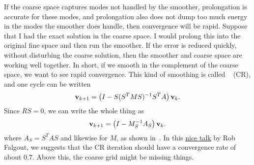 \begin{refsection}
If the coarse space captures modes not handled by the smoother, prolongation is accurate for these modes, and prolongation also does not dump too much energy in the modes the smoother does handle, then convergence will be rapid. Suppose that I had the exact solution in the coarse space. I would prolong this into the original fine space and then run the smoother. If the error is reduced quickly, without disturbing the coarse solution, then the smoother and coarse space are working well together. In short, if we smooth in the complement of the coarse space, we want to see rapid convergence. This kind of smoothing is called ~\parencite{Brandt2000,BrannickFalgout2007} (CR), and one cycle can be written
\begin{align}
  \vb{v}_{k+1} = \left( I - S (S^T M S)^{-1} S^T A \right) \vb{v}_k.
\end{align}
Since $R S = 0$, we can write the whole thing as
\begin{align}
  \vb{v}_{k+1} = \left( I - M_S^{-1} A_S \right) \vb{v}_k.
\end{align}
where $A_S = S^T A S$ and likewise for $M$, as shown in~\parencite{BrannickEtAl2018}. In this \href{https://www.ima.umn.edu/materials/2010-2011/W11.29-12.3.10/10309/ima-2010-cr-v3.pdf}{nice talk} by Rob Falgout, we suggests that the CR iteration should have a convergence rate of about 0.7. Above this, the coarse grid might be missing things.


\end{refsection}
